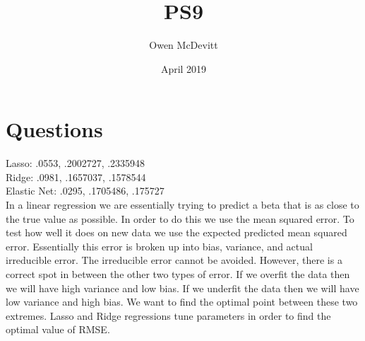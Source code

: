 \documentclass{article}
\title{PS9}
\author{Owen McDevitt}
\date{April 2019}
\begin{document}
\maketitle

\section{Questions}
 Lasso: .0553, .2002727, .2335948
 \\
 Ridge: .0981,  .1657037, .1578544
 \\
 Elastic Net: .0295, .1705486, .175727
\\
In a linear regression we are essentially trying to predict a beta that is as close to the true value as possible. In order to do this we use the mean squared error. To test how well it does on new data we use the expected predicted mean squared error. Essentially this error is broken up into bias, variance, and actual irreducible error. The irreducible error cannot be avoided. However, there is a correct spot in between the other two types of error. If we overfit the data then we will have high variance and low bias. If we underfit the data then we will have low variance and high bias. We want to find the optimal point between these two extremes. Lasso and Ridge regressions tune parameters in order to find the optimal value of RMSE.
\end{document}
